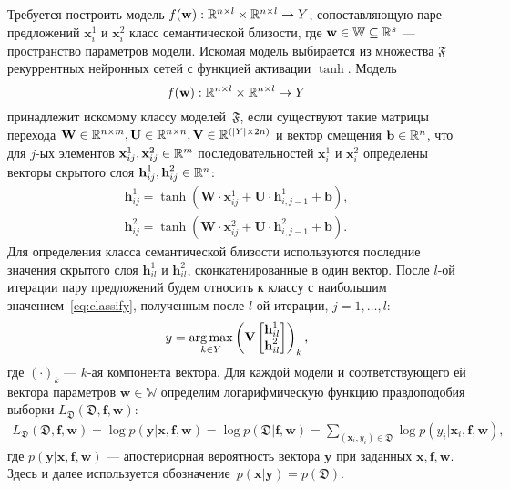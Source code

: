 \documentclass[12pt, fleqn, unicode]{article}
\newcommand{\PP}{p}
\newcommand{\DD}{{\mathfrak{D}}}
\newcommand{\FFF}{{\mathfrak{F}}}
\newcommand{\WW}{{\mathbb{W}}}
\newcommand{\bw}{{\textbf{w}}}
\newcommand{\bb}{{\textbf{b}}}
\newcommand{\bx}{{\textbf{x}}}
\newcommand{\bbf}{{\textbf{f}}}
\newcommand{\by}{{\textbf{y}}}
\newcommand{\bW}{{\textbf{W}}}
\newcommand{\bU}{{\textbf{U}}}
\newcommand{\bV}{{\textbf{V}}}
\newcommand{\bh}{{\textbf{h}}}
\begin{document}
Требуется построить модель $f(\bw): \RR^{n\times l} \times \RR^{n\times l} \to Y$, сопоставляющую паре предложений $\bx_i^1$ и $\bx_i^2$ класс семантической близости, где $\bw \in \WW\subseteq\RR^s$ --- пространство параметров модели.
Искомая модель выбирается из множества $\FFF$ рекуррентных нейронных сетей с функцией активации $\tanh$. Модель 
\[
f(\bw): \RR^{n\times l} \times \RR^{n\times l} \to Y
\]
принадлежит искомому классу моделей~$\FFF$, если существуют такие матрицы перехода $\bW\in \RR^{n\times m}, \bU\in \RR^{n\times n}, \bV\in \RR^{(|Y| \times 2n)}$ и вектор смещения $\bb \in \RR^{n}$, что для $j$-ых элементов $\bx_{ij}^1, \bx_{ij}^2 \in \RR^m$ последовательностей $\bx_i^1$ и $\bx_i^2$ определены векторы скрытого слоя $\bh_{ij}^1, \bh_{ij}^2 \in \RR^{n}$:
\begin{gather}
	\bh_{ij}^1 = \tanh(\bW\cdot \bx_{ij}^1 + \bU\cdot \bh_{i,j-1}^1 + \bb),\\
	\bh_{ij}^2 = \tanh(\bW\cdot \bx_{ij}^2 + \bU\cdot \bh_{i,j-1}^2 + \bb).
\end{gather}
Для определения класса семантической близости используются последние значения скрытого слоя $\bh_{il}^1$ и $\bh_{il}^2$, сконкатенированные в один вектор. После $l$-ой итерации пару предложений будем относить к классу с наибольшим значением~\eqref{eq:classify}, полученным после $l$-ой итерации, $j=1,\dots,l$:
\begin{gather}
	y = \argmax_{k\in Y}
	\left(\bV%
	\begin{bmatrix}
		\bh_{il}^1\\
		\bh_{il}^2
	\end{bmatrix}\right)_k,
	\label{eq:classify}
\end{gather}
где $(\cdot)_k$ --- $k$-ая компонента вектора. 
Для каждой модели и соответствующего ей вектора параметров $\bw \in \WW$ определим логарифмическую функцию правдоподобия выборки $L_\DD(\DD,\bbf,\bw)$:
\begin{gather}
	L_\DD(\DD, \bbf,\bw) = \log\PP(\by|\bx,\bbf,\bw) = \log\PP(\DD|\bbf,\bw) = \sum_{(\bx_i,y_i)\in\DD} \log\PP(y_i|\bx_i,\bbf,\bw) \label{L^N},
\end{gather}
где $\PP(\by|\bx,\bbf,\bw)$ --- апостериорная вероятность вектора $\by$ при заданных $\bx,\bbf,\bw$.
Здесь и далее используется обозначение~$\PP(\bx|\by) = \PP(\DD)$.
\end{document}
